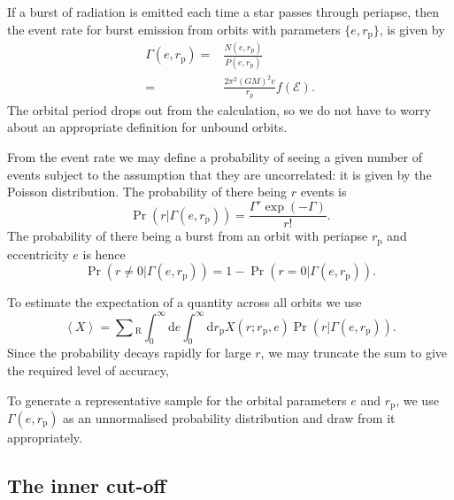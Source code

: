 \documentclass[useAMS,usedcolumn,usegraphicx,usenatbib]{mn2e}
\newcommand{\sub}[1]{\ensuremath{_\mathrm{#1}}}
\newcommand{\dd}{\ensuremath{\mathrm{d}}}
\begin{document}
If a burst of radiation is emitted each time a star passes through periapse, then the event rate for burst emission from orbits with parameters $\{e, r\sub{p}\}$, is given by
\begin{align}
\Gamma(e, r\sub{p}) = {} & \frac{N(e, r\sub{p})}{P(e, r\sub{p})}\\
 = {} & \frac{2\pi^2(GM)^2 e}{r\sub{p}}f(\mathcal{E}).
\label{eq:Gamma}
\end{align}
The orbital period drops out from the calculation, so we do not have to worry about an appropriate definition for unbound orbits.

From the event rate we may define a probability of seeing a given number of events subject to the assumption that they are uncorrelated: it is given by the Poisson distribution. The probability of there being $r$ events is
\begin{equation}
\Pr(r|\Gamma(e, r\sub{p})) = \frac{\Gamma^r\exp(-\Gamma)}{r!}.
\end{equation}
The probability of there being a burst from an orbit with periapse $r\sub{p}$ and eccentricity $e$ is hence
\begin{equation}
\Pr(r \neq 0|\Gamma(e, r\sub{p})) = 1 - \Pr(r = 0|\Gamma(e, r\sub{p})).
\end{equation}

To estimate the expectation of a quantity across all orbits we use
\begin{equation}
\left\langle X\right\rangle = \sum\sub{R} \int_0^\infty \dd e \int_0^\infty \dd r\sub{p} X(r;r\sub{p},e)\Pr(r|\Gamma(e, r\sub{p})).
\end{equation}
Since the probability decays rapidly for large $r$, we may truncate the sum to give the required level of accuracy,

To generate a representative sample for the orbital parameters $e$ and $r\sub{p}$, we use $\Gamma(e, r\sub{p})$ as an unnormalised probability distribution and draw from it appropriately.

\subsection{The inner cut-off}
\end{document}
